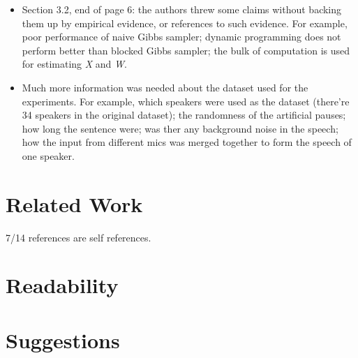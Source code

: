 \documentclass[11pt,a4paper]{article}
\begin{document}
\begin{itemize}
 \item Section 3.2, end of page 6: the authors threw some claims without backing them up by empirical evidence, or references to such evidence. For example,
poor performance of naive Gibbs sampler; dynamic programming does not perform better than blocked Gibbs sampler; the bulk of computation is used for estimating
 \textit{X} and \textit{W}.
 \item Much more information was needed about the dataset used for the experiments. For example, which speakers were used as the dataset (there're 34 speakers
in the original dataset); the randomness of the artificial pauses; how long the sentence were; was ther any background noise in the speech; how the input from
different mics was merged together to form the speech of one speaker.
\end{itemize}



\section{Related Work}
7/14 references are self references.


\section{Readability}


\section{Suggestions}
\end{document}
